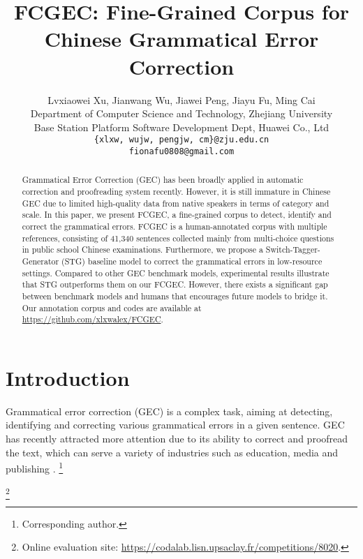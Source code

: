 \documentclass[11pt]{article}
\title{FCGEC: Fine-Grained Corpus for Chinese Grammatical Error Correction}
\author{Lvxiaowei Xu, Jianwang Wu, Jiawei Peng, Jiayu Fu, Ming Cai \\ Department of Computer Science and Technology, Zhejiang University \\
Base Station Platform Software Development Dept, Huawei Co., Ltd \\
\texttt{\{xlxw, wujw, pengjw, cm\}@zju.edu.cn} \\
\texttt{fionafu0808@gmail.com}}
\newcommand\blfootnote[1]{\begingroup
  \renewcommand\thefootnote{}\footnote{#1}\addtocounter{footnote}{-1}\endgroup
}
\begin{document}
\maketitle
\begin{abstract}
Grammatical Error Correction (GEC) has been broadly applied in automatic correction and proofreading system recently. However, it is still immature in Chinese GEC due to limited high-quality data from native speakers in terms of category and scale. In this paper, we present FCGEC, a fine-grained corpus to detect, identify and correct the grammatical errors. FCGEC is a human-annotated corpus with multiple references, consisting of 41,340 sentences collected mainly from multi-choice questions in public school Chinese examinations. Furthermore, we propose a  Switch-Tagger-Generator (STG) baseline model to correct the grammatical errors in low-resource settings. Compared to other GEC benchmark models, experimental results illustrate that STG outperforms them on our FCGEC. However, there exists a significant gap between benchmark models and humans that encourages future models to bridge it. Our annotation corpus and codes are available at \url{https://github.com/xlxwalex/FCGEC}.
\end{abstract} 
\section{Introduction}

Grammatical error correction (GEC) is a complex task, aiming at detecting, identifying and correcting various grammatical errors in a given sentence. GEC has recently attracted more attention due to its ability to correct and proofread the text, which can serve a variety of industries such as education, media and publishing \cite{wang2021comprehensive}.\blfootnote{ Corresponding author.}\blfootnote{ Online evaluation site: \url{https://codalab.lisn.upsaclay.fr/competitions/8020}.}
\end{document}

